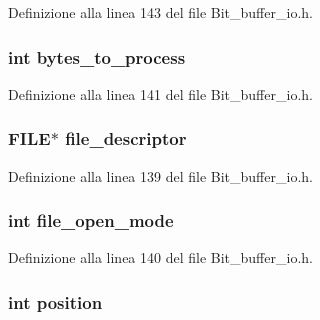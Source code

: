 Definizione alla linea 143 del file Bit\-\_\-buffer\-\_\-io.\-h.

\hypertarget{struct__bit__buffer__t_aed9cc2d1f884f0962afd7f75bce3be7e}{
\subsubsection[{bytes\-\_\-to\-\_\-process}]{\setlength{\rightskip}{0pt plus 5cm}int bytes\-\_\-to\-\_\-process}}\label{struct__bit__buffer__t_aed9cc2d1f884f0962afd7f75bce3be7e}


Definizione alla linea 141 del file Bit\-\_\-buffer\-\_\-io.\-h.

\hypertarget{struct__bit__buffer__t_a52a785c913c28c61f56c4aa10e3a1641}{
\subsubsection[{file\-\_\-descriptor}]{\setlength{\rightskip}{0pt plus 5cm}F\-I\-L\-E$\ast$ file\-\_\-descriptor}}\label{struct__bit__buffer__t_a52a785c913c28c61f56c4aa10e3a1641}


Definizione alla linea 139 del file Bit\-\_\-buffer\-\_\-io.\-h.

\hypertarget{struct__bit__buffer__t_a5fce2ea8679deec1a923d8a352bd5b94}{
\subsubsection[{file\-\_\-open\-\_\-mode}]{\setlength{\rightskip}{0pt plus 5cm}int file\-\_\-open\-\_\-mode}}\label{struct__bit__buffer__t_a5fce2ea8679deec1a923d8a352bd5b94}


Definizione alla linea 140 del file Bit\-\_\-buffer\-\_\-io.\-h.

\hypertarget{struct__bit__buffer__t_a401e942526aac47cef94f478182486e7}{
\subsubsection[{position}]{\setlength{\rightskip}{0pt plus 5cm}int position}}\label{struct__bit__buffer__t_a401e942526aac47cef94f478182486e7}


